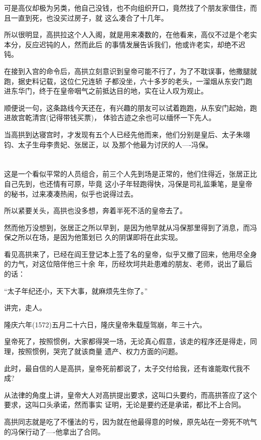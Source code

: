 \documentclass[11pt,a4paper,onecolumn]{article}
\begin{document}
可是高仪却极为另类，他自己没钱，也不向组织开口，竟然找了个朋友家借住，而且一直到死，也没买过房子，就
这么凑合了十几年。

所以很明显，高拱拉这个人入阁，就是用来凑数的，在他看来，高仪不过是个老实本分，反应迟钝的人，然而此后
的事情发展告诉我们，他或许老实，却绝不迟钝。

在接到入宫的命令后，高拱立刻意识到皇帝可能不行了，为了不耽误事，他撒腿就跑，据史料记载，这位仁兄连轿
子都没坐，六十多岁的老头，一溜烟从东安门跑进东华门，终于在皇帝咽气之前抵达目的地，实在让人叹为观止。

顺便说一句，这条路线今天还在，有兴趣的朋友可以试着跑跑，从东安门起始，跑进故宫乾清宫(记得带钱买票)，
体验古迹之余也可以缅怀一下先人。

当高拱到达寝宫时，才发现有五个人已经先他而来，他们分别是皇后、太子朱翊钧、太子生母李贵妃、张居正，以
及那个他最为讨厌的人----冯保。

\section[\thesection]{}

这是一个看似平常的人员组合，前三个人先到场是正常的，他们住得近，张居正比自己先到，也还情有可原，毕竟
这小子年轻跑得快，冯保是司礼监秉笔，是皇帝的秘书，过来凑凑热闹，似乎也说得过去。

所以紧要关头，高拱也没多想，奔着半死不活的皇帝去了。

然而他万没想到，张居正之所以早到，是因为他早就从冯保那里得到了消息，而冯保之所以在场，是因为他策划已
久的阴谋即将在此实现。

看见高拱来了，已经在阎王登记本上签了名的皇帝，似乎又撤了回来，他用尽全身的力气，对这位陪伴他三十余
年，历经坎坷共赴患难的朋友、老师，说出了最后的话：

``太子年纪还小，天下大事，就麻烦先生你了。''

讲完，走人。

隆庆六年(1572)五月二十六日，隆庆皇帝朱载垕驾崩，年三十六。

皇帝死了，按照惯例，大家都得哭一场，无论真心假意，该走的程序还是得走，同理，按照惯例，哭完了就该商量
遗产、权力方面的问题。

此时，最自信的人是高拱，皇帝死前都说了，太子交付给我，还有谁能取代我不成?

从法律的角度上讲，皇帝大人对高拱提出要求，这叫口头要约，而高拱答应了这个要求，这叫口头承诺，然而事实
证明，无论是要约还是承诺，都比不上合同。

高拱同志就是吃了不懂法的亏，因为就在他最得意的时候，原先站在一旁死不吭气的冯保行动了----他拿出了合同。
\end{document}
